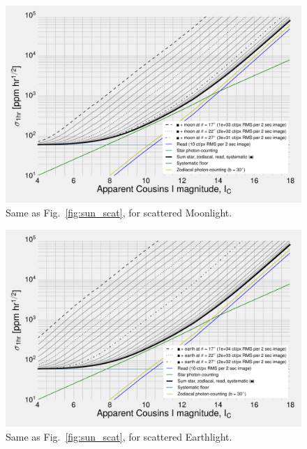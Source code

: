 \begin{figure}[!t]
	\centering
	\includegraphics{figures/precision_angles_moon.pdf}
	\caption{Same as Fig.~\protect\ref{fig:sun_scat}, for scattered Moonlight.} 
	\label{fig:moon_scat}
\end{figure}
\begin{figure}[!t]
	\centering
	\includegraphics{figures/precision_angles_earth.pdf}
	\caption{Same as Fig.~\protect\ref{fig:sun_scat}, for scattered 
	Earthlight.} 
	\label{fig:earth_scat}
\end{figure}